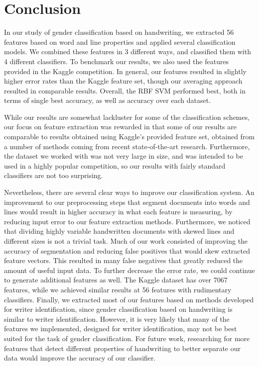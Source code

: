 \documentclass[paper=a4, fontsize=11pt]{scrartcl} %
\numberwithin{equation}{section} %
\numberwithin{figure}{section} %
\numberwithin{table}{section} %
\begin{document}
\section{Conclusion}
In our study of gender classification based on handwriting, we
extracted 56 features based on word and line properties and applied
several classification models. We combined these features in 3
different ways, and classified them with 4 different classifiers. To
benchmark our results, we also used the features provided in the
Kaggle competition. In general, our features resulted in slightly
higher error rates than the Kaggle feature set, though our averaging
approach resulted in comparable results. Overall, the RBF SVM
performed best, both in terms of single best accuracy, as well as
accuracy over each dataset.

While our results are somewhat lackluster for some of the
classification schemes, our focus on feature extraction was rewarded
in that some of our results are comparable to results obtained using
Kaggle's provided feature set, obtained from a number of methods coming
from recent state-of-the-art research. Furthermore, the dataset we
worked with was not very large in size, and was intended to be used in
a highly popular competition, so our results with fairly standard
classifiers are not too surprising.

Nevertheless, there are several clear ways to improve our
classification system. An improvement to our preprocessing steps that
segment documents into words and lines would result in higher accuracy
in what each feature is measuring, by reducing input error to our
feature extraction methods. Furthermore, we noticed that dividing
highly variable handwritten documents with skewed lines and different
sizes is not a trivial task. Much of our work consisted of improving
the accuracy of segmentation and reducing false positives that would
skew extracted feature vectors. This resulted in many false negatives
that greatly reduced the amount of useful input data. To further
decrease the error rate, we could continue to generate additional
features as well. The Kaggle dataset has over 7067 features, while we
achieved similar results at 56 features with rudimentary
classifiers. Finally, we extracted most of our features based on
methods developed for writer identification, since gender
classification based on handwriting is similar to writer
identification. However, it is very likely that many of the features
we implemented, designed for writer identification, may not be best
suited for the task of gender classification. For future work, 
researching for more features that detect different
properties of handwriting to better separate our data would
improve the accuracy of our classifier.



\end{document}
